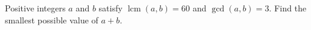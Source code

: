 Positive integers $a$ and $b$ satisfy $\operatorname{lcm}(a,b)=60$ and $\gcd(a,b)=3$. Find the smallest possible value of $a+b$.
